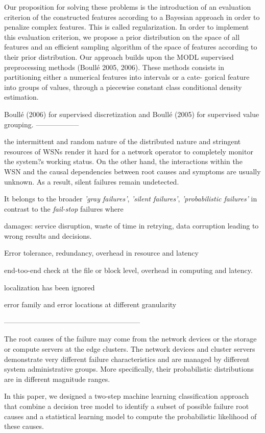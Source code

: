 Our proposition for solving these problems is the introduction of an evaluation criterion of the constructed features according to a Bayesian approach in order to penalize complex features. This is called regularization. In order to implement this evaluation criterion, we propose a prior distribution on the space of all features and an efficient sampling algorithm of the space of features according to their prior distribution. Our approach builds upon the MODL supervised preprocessing methods (Boullé 2005, 2006). These methods consists in partitioning either a numerical features into intervals or a cate- gorical feature into groups of values, through a piecewise constant class conditional density estimation.

Boullé (2006) for supervised discretization and Boullé (2005) for supervised value grouping.
------------------


 the intermittent and random nature of 
the distributed nature and stringent resources of WSNs render it hard for a network operator to completely monitor the system?s working status.
On the other hand, the interactions within the WSN and the causal dependencies between root causes and symptoms are usually unknown.
As a result, silent failures remain undetected.

It belongs to the broader {\it'gray failures'}, {\it'silent failures'}, {\it'probabilistic failures'}  in contrast to the {\it fail-stop} failures where

damages: service disruption, waste of time in retrying, data corruption leading to wrong results and decisions. 
  
Error tolerance, redundancy, overhead in resource and latency

end-too-end check at the file or block level, overhead in computing and latency.

localization has been ignored

error family and error locations at different granularity 


---------------------------------------------------------

The root causes of the failure may come from the network devices or the storage or compute servers at the edge clusters. The network devices and cluster servers demonstrate very different failure characteristics and are managed by different system administrative groups. More specifically, their probabilistic distributions are in different magnitude ranges.     

In this paper, we designed a two-step machine learning classification approach that combine a decision tree model to identify a subset of possible failure root causes and a statistical learning model to 
compute the probabilistic likelihood of these causes. 



